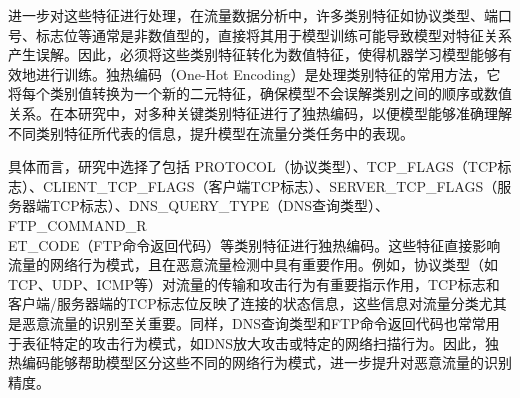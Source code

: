 \documentclass[promaster]{thesis-uestc}
\begin{document}
进一步对这些特征进行处理，在流量数据分析中，许多类别特征如协议类型、端口号、标志位等通常是非数值型的，直接将其用于模型训练可能导致模型对特征关系产生误解。因此，必须将这些类别特征转化为数值特征，使得机器学习模型能够有效地进行训练。独热编码（One-Hot Encoding）是处理类别特征的常用方法，它将每个类别值转换为一个新的二元特征，确保模型不会误解类别之间的顺序或数值关系。在本研究中，对多种关键类别特征进行了独热编码，以便模型能够准确理解不同类别特征所代表的信息，提升模型在流量分类任务中的表现。

具体而言，研究中选择了包括 PROTOCOL（协议类型）、TCP\_FLAGS（TCP标志）、CLIENT\_TCP\_FLAGS（客户端TCP标志）、SERVER\_TCP\_FLAGS（服务器端TCP标志）、DNS\_QUERY\_TYPE（DNS查询类型）、FTP\_COMMAND\_R\\ET\_CODE（FTP命令返回代码）等类别特征进行独热编码。这些特征直接影响流量的网络行为模式，且在恶意流量检测中具有重要作用。例如，协议类型（如TCP、UDP、ICMP等）对流量的传输和攻击行为有重要指示作用，TCP标志和客户端/服务器端的TCP标志位反映了连接的状态信息，这些信息对流量分类尤其是恶意流量的识别至关重要。同样，DNS查询类型和FTP命令返回代码也常常用于表征特定的攻击行为模式，如DNS放大攻击或特定的网络扫描行为。因此，独热编码能够帮助模型区分这些不同的网络行为模式，进一步提升对恶意流量的识别精度。
\end{document}
